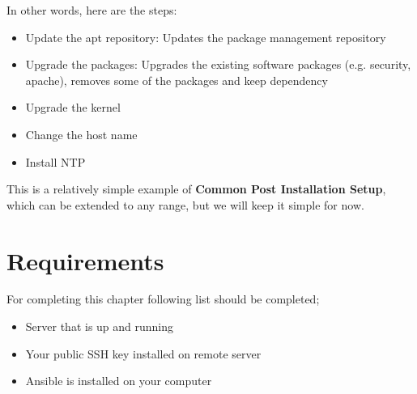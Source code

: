 \documentclass[10pt]{book}
\begin{document}
In other words, here are the steps:
\begin{itemize}
\item Update the apt repository: Updates the package management repository
\item Upgrade the packages: Upgrades the existing software packages (e.g. security, apache), 
removes some of the packages and keep dependency
\item Upgrade the kernel 
\item Change the host name
\item Install NTP
\end{itemize}

This is a relatively simple example of {\bf Common Post Installation Setup}, 
which can be extended to any range, but we will keep it simple for now. 

\section{Requirements}
For completing this chapter following list should be completed;
\begin{itemize}
\item Server that is up and running 
\item Your public SSH key installed on remote server
\item Ansible is installed on your computer
\end{itemize}
\end{document}
